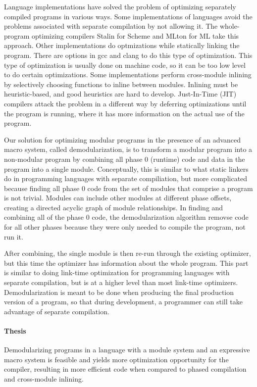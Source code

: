 Language implementations have solved the problem of optimizing separately compiled programs in various ways.
Some implementations of languages avoid the problems associated with separate compilation by not allowing it. 
The whole-program optimizing compilers Stalin \cite{stalin} for Scheme and MLton \cite{mlton} for ML take this approach.
Other implementations do optmizations while statically linking the program.
There are options in gcc \cite{gcc} and clang \cite{clang} to do this type of optimization.
This type of optimization is usually done on machine code, so it can be too low level to do certain optimizations.
Some implementations perform cross-module inlining by selectively choosing functions to inline between modules.
Inlining must be heuristic-based, and good heuristics are hard to develop. 
Just-In-Time (JIT) compilers attack the problem in a different way by deferring optimizations until the program is running, where it has more information on the actual use of the program.

Our solution for optimizing modular programs in the presence of an advanced macro system, called demodularization, is to transform a modular program into a non-modular program by combining all phase 0 (runtime) code and data in the program into a single module.
Conceptually, this is similar to what static linkers do in programming languages with separate compiliation, but more complicated because finding all phase 0 code from the set of modules that comprise a program is not trivial.
Modules can include other modules at different phase offsets, creating a directed acyclic graph of module relationships.
In finding and combining all of the phase 0 code, the demodularization algorithm removse code for all other phases because they were only needed to compile the program, not run it.

After combining, the single module is then re-run through the existing optimizer, but this time the optimizer has information about the whole program.
This part is similar to doing link-time optimization for programming languages with separate compilation, but is at a higher level than most link-time optimizers.
Demodularization is meant to be done when producing the final production version of a program, so that during development, a programmer can still take advantage of separate compilation.

\paragraph{Thesis} Demodularizing programs in a language with a module system and an expressive macro system is feasible and yields more optimization opportunity for the compiler, resulting in more efficient code when compared to phased compilation and cross-module inlining.

